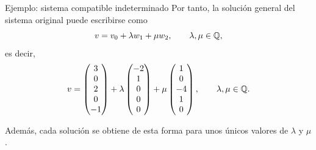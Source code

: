 \begin{frame}[allowframebreaks, t]{Ejemplo: sistema compatible indeterminado}
Por tanto, la solución general del sistema original puede escribirse
como
\[
v=v_0+\lambda w_1+\mu w_2,
\qquad \lambda,\mu\in \mathbb{Q},
\]
es decir,
\[
v=
\begin{pmatrix}
3\\
0\\
2\\
0\\
-1
\end{pmatrix}
+
\lambda
\begin{pmatrix}
-2\\
1\\
0\\
0\\
0
\end{pmatrix}
+
\mu
\begin{pmatrix}
1\\
0\\
-4\\
1\\
0
\end{pmatrix},
\qquad \lambda,\mu\in \mathbb{Q}.
\]

Además, cada solución se obtiene de esta forma para unos
\alert{únicos} valores de \(\lambda\) y \(\mu\).

\end{frame}

